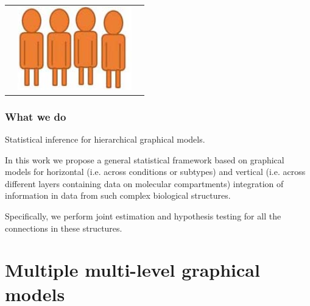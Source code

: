 \documentclass[10pt]{beamer}
\theoremstyle{definition}
\begin{document}
\begin{frame}
\begin{center}
\begin{scriptsize}
\begin{tabular}{ccc}
\vspace{.5em}
& \includegraphics[width=.2\textwidth]{profile3}
\vspace{.5em}
\end{tabular}
\end{scriptsize}
\end{center}
\end{frame}

\begin{frame}
\frametitle{What we do}

{\colrbf Statistical inference for hierarchical graphical models.}
\vspace{1em}

In this work we propose a general statistical framework based on graphical models for {\colbit horizontal} (i.e. across conditions or subtypes) {\colbit and vertical} (i.e. across different layers containing data on molecular compartments) {\colbit integration of information} in data from such complex biological structures.

\vspace{1em}
Specifically, we perform {\colbit joint estimation and hypothesis testing} for all the connections in these structures.

\end{frame}


\section{Multiple multi-level graphical models}
\end{document}
